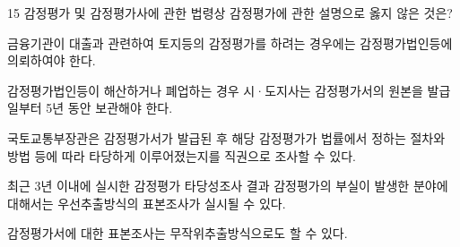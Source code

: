 \begin{question}{15}
감정평가 및 감정평가사에 관한 법령상 감정평가에 관한 설명으로 옳지 않은 것은?
\begin{choices}
  \item 금융기관이 대출과 관련하여 토지등의 감정평가를 하려는 경우에는 감정평가법인등에 의뢰하여야 한다.
  \item 감정평가법인등이 해산하거나 폐업하는 경우 시·도지사는 감정평가서의 원본을 발급일부터 5년 동안 보관해야 한다.
  \item 국토교통부장관은 감정평가서가 발급된 후 해당 감정평가가 법률에서 정하는 절차와 방법 등에 따라 타당하게 이루어졌는지를 직권으로 조사할 수 있다.
  \item 최근 3년 이내에 실시한 감정평가 타당성조사 결과 감정평가의 부실이 발생한 분야에 대해서는 우선추출방식의 표본조사가 실시될 수 있다.
  \item 감정평가서에 대한 표본조사는 무작위추출방식으로도 할 수 있다.
\end{choices}
\end{question}
